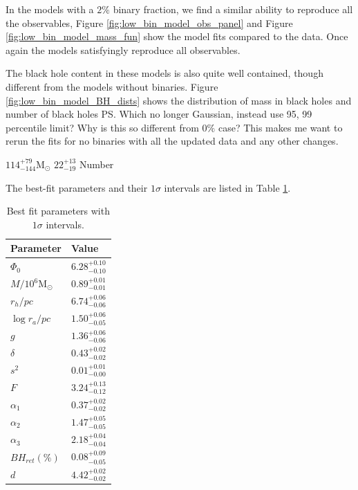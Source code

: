 In the models with a $2\%$ binary fraction, we find a similar ability to reproduce all the
observables, Figure \ref{fig:low_bin_model_obs_panel} and Figure \ref{fig:low_bin_model_mass_fun}
show the model fits compared to the data. Once again the models satisfyingly reproduce all
observables.

The black hole content in these models is also quite well contained, though different from the
models without binaries. Figure \ref{fig:low_bin_model_BH_dists} shows the distribution of mass in
black holes and number of black holes \ps{Which no longer Gaussian, instead use 95, 99 percentile
	limit? Why is this so different from $0\%$ case? This makes me want to rerun the fits for no
	binaries with all the updated data and any other changes.}


$114^{+79}_{-144} \mathrm{M}_\odot$
$22^{+13}_{-19}$ Number


The best-fit parameters and their $1\sigma$ intervals are listed in Table \ref{tab:parameters_lowbin}.


\begin{table}
	\centering
	\caption{Best fit parameters with $1\sigma$ intervals.}
	\begin{tabular}{l l}

		\hline
		Parameter                 & Value                  \\
		\hline
		$\Phi_0$                  & $6.28^{+0.10}_{-0.10}$ \\
		$M/10^6 \mathrm{M}_\odot$ & $0.89^{+0.01}_{-0.01}$ \\
		$r_h / pc$                & $6.74^{+0.06}_{-0.06}$ \\
		$\log{r_a / pc}$          & $1.50^{+0.06}_{-0.05}$ \\
		$g$                       & $1.36^{+0.06}_{-0.06}$ \\
		$\delta$                  & $0.43^{+0.02}_{-0.02}$ \\
		$s^2$                     & $0.01^{+0.01}_{-0.00}$ \\
		$F$                       & $3.24^{+0.13}_{-0.12}$ \\
		$\alpha_1$                & $0.37^{+0.02}_{-0.02}$ \\
		$\alpha_2$                & $1.47^{+0.05}_{-0.05}$ \\
		$\alpha_3$                & $2.18^{+0.04}_{-0.04}$ \\
		$BH_{ret} (\%)$           & $0.08^{+0.09}_{-0.05}$ \\
		$d$                       & $4.42^{+0.02}_{-0.02}$ \\
		\hline
	\end{tabular}
	\label{tab:parameters_lowbin}
\end{table}

